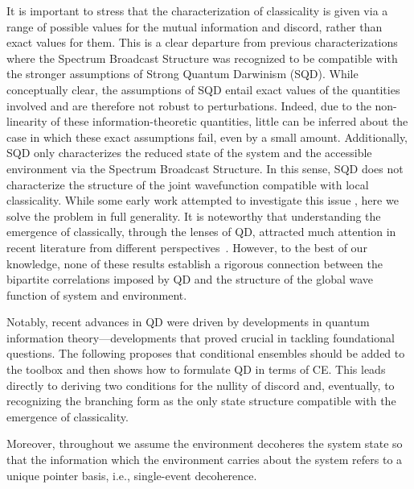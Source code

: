\documentclass[a4paper,11pt,accepted=2024-09-14]{quantumarticle}
\newcommand{\+}         {\dagger}
\begin{document}
{It is important to stress that the characterization of classicality is given via a range of possible values for the mutual information and discord, rather than exact values for them. This is a clear departure from previous characterizations~\cite{strongqd1,strongqd2} where the Spectrum Broadcast Structure was recognized to be compatible with the stronger assumptions of Strong Quantum Darwinism (SQD). {While conceptually clear, the assumptions of SQD entail exact values of the quantities involved and are therefore not robust to perturbations. Indeed, due to the non-linearity of these information-theoretic quantities, little can be inferred about the case in which these exact assumptions fail, even by a small amount. Additionally, SQD only characterizes the reduced state of the system and the accessible environment via the Spectrum Broadcast Structure. In this sense, SQD does not characterize the structure of the joint wavefunction compatible with local classicality. While some early work attempted to investigate this issue \cite{ffs0}, here we solve the problem in full generality.} It is noteworthy that understanding the emergence of classically, through the lenses of QD, attracted much attention in recent literature from different perspectives~\cite{ffs1,ffs2,ffs3}. However, to the best of our knowledge, none of these results establish a rigorous connection between the bipartite correlations imposed by QD and the structure of the global wave function of system and environment.}

Notably, recent advances in QD were driven by developments in quantum information theory---developments that proved crucial in tackling foundational questions. The following proposes that {conditional ensembles} should be added to the toolbox and then shows how to formulate QD in terms of {CE}. This leads directly to deriving two conditions for the nullity of discord and, eventually, to recognizing the branching form as the only state structure compatible with the emergence of classicality.

{Moreover, throughout we assume the environment decoheres the system state so that the information which the environment carries about the system refers to a unique pointer basis, i.e., single-event decoherence.}
\end{document}
